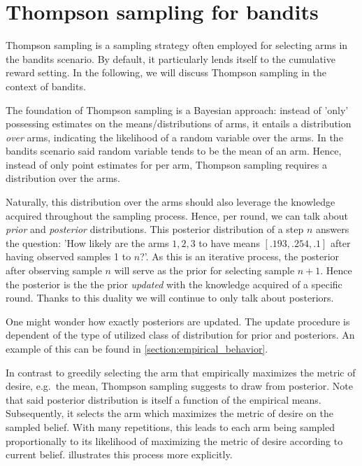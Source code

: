 \section{Thompson sampling for bandits}

Thompson sampling is a sampling strategy often employed for selecting arms in
the bandits scenario. By default, it particularly lends itself to the cumulative
reward setting. In the following, we will discuss Thompson sampling in the
context of bandits.

The foundation of Thompson sampling is a Bayesian approach: instead of 'only'
possessing estimates on the means/distributions of arms, it entails a
distribution \emph{over} arms, indicating the likelihood of a random variable
over the arms. In the bandits scenario said random variable tends to be the mean
of an arm. Hence, instead of only point estimates for per arm, Thompson sampling requires a distribution over the arms.

Naturally, this distribution over the arms should also leverage the knowledge
acquired throughout the sampling process. Hence, per round, we can talk about
\emph{prior} and \emph{posterior} distributions. This posterior distribution of
a step $n$ answers the question: 'How likely are the arms $1, 2, 3$ to have
means $[.193, .254, .1]$ after having observed samples 1 to $n$?'. As this is an
iterative process, the posterior after observing sample $n$ will serve as the
prior for selecting sample $n+1$. Hence the posterior is the the prior
\emph{updated} with the knowledge acquired of a specific round. Thanks to this
duality we will continue to only talk about posteriors.

One might wonder how exactly posteriors are updated. The update procedure is
dependent of the type of utilized class of distribution for prior and
posteriors. An example of this can be found in \ref{section:empirical_behavior}.

In contrast to greedily selecting the arm that empirically maximizes the metric
of desire, e.g.\ the mean, Thompson sampling suggests to draw from posterior.
Note that said posterior distribution is itself a function of the empirical
means. Subsequently, it selects the arm which maximizes the metric of desire on
the sampled belief. With many repetitions, this leads to each arm being sampled
proportionally to its likelihood of maximizing the metric of desire according to
current belief.  illustrates this process more
explicitly.


